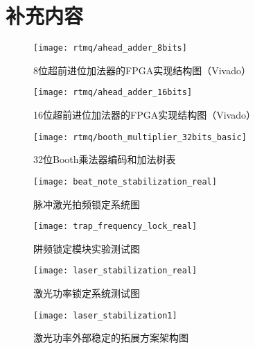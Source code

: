 
\chapter{补充内容}


\begin{figure}
    \centering
    \caption[8位超前进位加法器的FPGA实现结构图]{8位超前进位加法器的FPGA实现结构图（Vivado）\label{fig:ahead_adder_8bits}}
    \texttt{[image: rtmq/ahead\_adder\_8bits]}
\end{figure}

\begin{figure}
    \centering
    \caption[16位超前进位加法器的FPGA实现结构图]{16位超前进位加法器的FPGA实现结构图（Vivado）\label{fig:ahead_adder_16bits}}
    \texttt{[image: rtmq/ahead\_adder\_16bits]}
\end{figure}


\begin{figure}
    \centering
    \caption[32位Booth乘法器编码和加法树表]{32位Booth乘法器编码和加法树表\label{fig:booth_multiplier_32bits_basic}}
    \texttt{[image: rtmq/booth\_multiplier\_32bits\_basic]}
\end{figure}

\begin{figure}
    \centering
    \caption[脉冲激光拍频锁定系统图]{脉冲激光拍频锁定系统图\label{fig:beat_note_stabilization_real}}
    \texttt{[image: beat\_note\_stabilization\_real]}
\end{figure}

\begin{figure}
    \centering
    \caption[阱频锁定模块实验测试图]{阱频锁定模块实验测试图\label{fig:trap_frequency_lock_real}}
    \texttt{[image: trap\_frequency\_lock\_real]}
\end{figure}

\begin{figure}
    \centering
    \caption[激光功率锁定系统测试图]{激光功率锁定系统测试图\label{fig:laser_stabilization_real}}
    \texttt{[image: laser\_stabilization\_real]}
\end{figure}

\begin{figure}
    \centering
    \caption[激光功率外部稳定的拓展方案架构图]{激光功率外部稳定的拓展方案架构图\label{fig:laser_stabilization}}
    \texttt{[image: laser\_stabilization1]}
\end{figure}